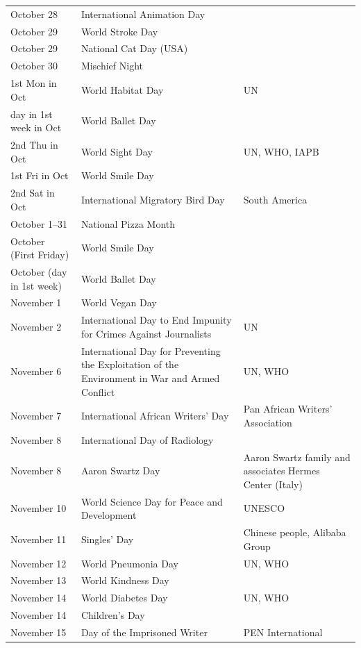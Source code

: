 \documentclass[
  openany]{book}
\begin{document}
\begin{longtable}[t]{>{\raggedright\arraybackslash}p{8em}>{\raggedright\arraybackslash}p{18em}>{\raggedright\arraybackslash}p{10em}}
October 28 & International Animation Day & \\
\rowcolor{gray!6}  October 29 & World Stroke Day & \\
\addlinespace
October 29 & National Cat Day (USA) & \\
\rowcolor{gray!6}  October 30 & Mischief Night & \\
1st Mon in Oct & World Habitat Day & UN\\
\rowcolor{gray!6}  day in 1st week in Oct & World Ballet Day & \\
2nd Thu in Oct & World Sight Day & UN, WHO, IAPB\\
\addlinespace
\rowcolor{gray!6}  1st Fri in Oct & World Smile Day & \\
2nd Sat in Oct & International Migratory Bird Day & South America\\
\rowcolor{gray!6}  October 1–31 & National Pizza Month & \\
October (First Friday) & World Smile Day & \\
\rowcolor{gray!6}  October (day in 1st week) & World Ballet Day & \\
\addlinespace
November 1 & World Vegan Day & \\
\rowcolor{gray!6}  November 2 & International Day to End Impunity for Crimes Against Journalists & UN\\
November 6 & International Day for Preventing the Exploitation of the Environment in War and Armed Conflict & UN, WHO\\
\rowcolor{gray!6}  November 7 & International African Writers' Day & Pan African Writers' Association\\
November 8 & International Day of Radiology & \\
\addlinespace
\rowcolor{gray!6}  November 8 & Aaron Swartz Day & Aaron Swartz family and associates Hermes Center (Italy)\\
November 10 & World Science Day for Peace and Development & UNESCO\\
\rowcolor{gray!6}  November 11 & Singles' Day & Chinese people, Alibaba Group\\
November 12 & World Pneumonia Day & UN, WHO\\
\rowcolor{gray!6}  November 13 & World Kindness Day \vphantom{1} & \\
\addlinespace
November 14 & World Diabetes Day & UN, WHO\\
\rowcolor{gray!6}  November 14 & Children's Day & \\
November 15 & Day of the Imprisoned Writer & PEN International\\

\end{longtable}
\end{document}

